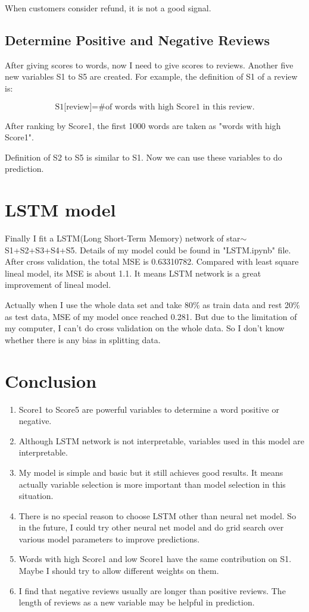 \documentclass[UTF8]{article}
\begin{document}
When customers consider refund, it is not a good signal.

\subsection{Determine Positive and Negative Reviews}

After giving scores to words, now I need to give scores to reviews. Another five  new variables S1 to S5 are created. For example, the definition of S1 of a review is:

\[
\text{S1[review]}=\text{\# of words with high Score1 in this review.}    
\]

After ranking by Score1, the first 1000 words are taken as "words with high Score1".

Definition of S2 to S5 is similar to S1. Now we can use these variables to do prediction.


\section{LSTM model}

Finally I fit a LSTM(Long Short-Term Memory) network of star$\sim$ S1+S2+S3+S4+S5. Details of my model could be found in "LSTM.ipynb" file. After cross validation, the total MSE is 0.63310782. Compared with least square lineal model, its MSE is about 1.1. It means LSTM network is a great improvement of lineal model. 

Actually when I use the whole data set and take 80\% as train data and rest 20\% as test data, MSE of my model once reached 0.281. But due to the limitation of my computer, I can't do cross validation on the whole data. So I don't know whether there is any bias in splitting data.

\section{Conclusion}

\begin{enumerate}
\item Score1 to Score5 are powerful variables to determine a word positive or negative.
\item Although LSTM network is not interpretable, variables used in this model are interpretable.
\item My model is simple and basic but it still achieves good results. It means actually variable selection is more important than model selection in this situation.
\item There is no special reason to choose LSTM other than neural net model. So in the future, I could try other neural net model and do grid search over various model parameters to improve predictions.
\item Words with high Score1 and low Score1 have the same contribution on S1. Maybe I should try to allow different weights on them.
\item I find that negative reviews usually are longer than positive reviews. The length of reviews as a new variable may be helpful in prediction.
\end{enumerate}
\end{document}
